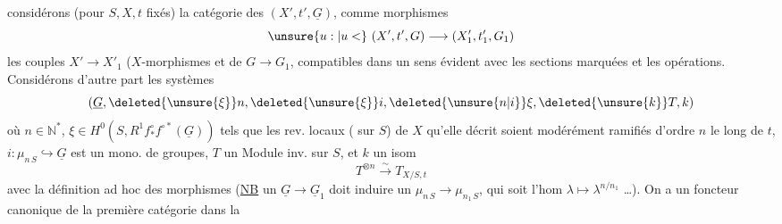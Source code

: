  considérons (pour $S,X,t$ fixés) la catégorie des $(X',t',\underline G)$,   comme morphismes
\[
\unsure{u:|u<}\ (X',t',G)\longrightarrow(X'_1,t'_1,G_1)
\]
les  couples  $X'\to X'_1$ ($X$-morphismes et de $G\to G_1$, compatibles dans un sens évident avec les sections marquées et les opérations. Considérons d'autre part les  systèmes
\[
(\underline G,\deleted{\unsure{\xi}}n,\deleted{\unsure{\xi}}i,\deleted{\unsure{n|i}}\xi,\deleted{\unsure{k}}T,k)
\]
où $n\in\mathbb N^\ast$,  $\xi\in H^0(S,R^1f^\circ_\ast f^{\circ\ast}(\underline G))$ tels que les rev. locaux ( sur $S$) de $X$ qu'elle décrit soient modérément ramifiés d'ordre $n$ le long de $t$, $i:\mu_{n\,S}\hookrightarrow\underline G$ est un mono. de groupes, $T$ un Module inv. sur $S$, et $k$ un isom
\[
T^{\otimes n}\xrightarrow{\sim} T_{X/S,t}
\]
avec la définition ad hoc des morphismes (\uline{NB}  un $\underline G\to\underline G_1$ doit induire un  $\mu_{n\,S}\to\mu_{n_1\,S}$, qui soit l'hom  $\lambda\longmapsto\lambda^{n/n_1}$ \ldots). On a un foncteur canonique de la première catégorie dans la
